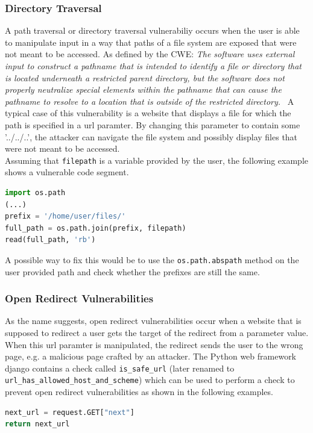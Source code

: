 \documentclass[
	a4paper,
	pagesize,
	pdftex,
	12pt,
	twoside, %
	BCOR=5mm, %
	ngerman,
	fleqn,
	final,
	]{scrartcl}
\begin{document}
\subsubsection{Directory Traversal}
A path traversal or directory traversal vulnerabiliy occurs when the user is able to manipulate input in a way that paths of a file system are exposed that were not meant to be accessed. 
As defined by the CWE: \textit{The software uses external input to construct a pathname that is intended to identify a file or directory that is located underneath a restricted parent directory, but the software does not properly neutralize special elements within the pathname that can cause the pathname to resolve to a location that is outside of the restricted directory.}~\cite{CommonWeaknessEnumeration.19.9.2019c}  A typical case of this vulnerability is a website that displays a file for which the path is specified in a url paramter. By changing this parameter to contain some '../../..', the attacker can navigate the file system and possibly display files that were not meant to be accessed.\\
Assuming that \texttt{filepath} is a variable provided by the user, the following example shows a vulnerable code segment.
\begin{lstlisting}[language=Python, showstringspaces=False]
import os.path
(...)
prefix = '/home/user/files/'
full_path = os.path.join(prefix, filepath)
read(full_path, 'rb')
\end{lstlisting}
A possible way to fix this would be to use the \texttt{os.path.abspath} method on the user provided path and check whether the prefixes are still the same. 



\subsubsection{Open Redirect Vulnerabilities}
As the name suggests, open redirect vulnerabilities occur when a website that is supposed to redirect a user gets the target of the redirect from a parameter value. When this url paramter is manipulated, the redirect sends the user to the wrong page, e.g. a malicious page crafted by an attacker. The Python web framework django contains a check called \texttt{is\_safe\_url} (later renamed to \texttt{url\_has\_allowed\_host\_and\_scheme}) which can be used to perform a check to prevent open redirect vulnerabilities as shown in the following examples.

\begin{lstlisting}[language=Python, showstringspaces=False]
next_url = request.GET["next"]
return next_url
\end{lstlisting}
\end{document}
